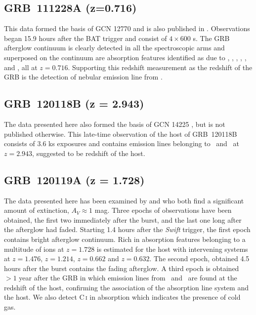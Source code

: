 \documentclass{aa}    %
\begin{document}
\subsection{GRB~111228A (z=0.716)} \label{111228}

This data formed the basis of GCN 12770 \citep{GCN12770} and is also published
in \cite{Kruhler2015}. Observations began 15.9 hours after the BAT trigger and
consist of $4 \times 600$ s. The GRB afterglow continuum is clearly detected in
all the spectroscopic arms and superposed on the continuum are absorption
features identified as due to \feii, \mnii, \mgii, \mgi, \cah, and \cak, all at
$z = 0.716$. Supporting this redshift measurement as the redshift of the GRB is
the detection of nebular emission line from \oiii.

\subsection{GRB~120118B (z = 2.943)} \label{120118}

The data presented here also formed the basis of GCN 14225 \citep{GCN14225}, but
is not published otherwise. This late-time observation of the host of
GRB~120118B consists of 3.6 ks exposures and contains emission lines belonging
to \oii~and \oiii~at $z = 2.943$, suggested to be redshift of the host.

\subsection{GRB~120119A (z = 1.728)} \label{120119}

The data presented here has been examined by \citet{Japelj2015} and
\citet{Zafar2017} who both find a significant amount of extinction, $A_V\approx
1$ mag. Three epochs of observations have been obtained, the first two
immediately after the burst, and the last one long after the afterglow had
faded. Starting 1.4 hours after the \textit{Swift} trigger, the first epoch
contains bright afterglow continuum. Rich in absorption features belonging to a
multitude of ions at $z =    1.728$ is estimated for the host with intervening
systems at $z = 1.476$, $z = 1.214$, $z = 0.662$ and $z = 0.632$. The second
epoch, obtained 4.5 hours after the burst contains the fading afterglow. A third
epoch is obtained $>1$ year after the GRB in which emission lines from \hb~and
\ha~are found at the redshift of the host, confirming the association of the
absorption line system and the host. We also detect C\,\textsc{i} in absorption
which indicates the presence of cold gas.
\end{document}
